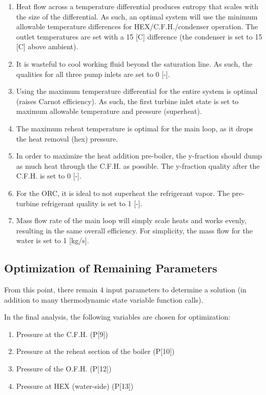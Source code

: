 \documentclass[10pt,cleanfoot]{asme2ej}
\begin{document}
\begin{enumerate}
\item
Heat flow across a temperature differential produces entropy that scales with the size of the differential. As such, an optimal system will use the minimum allowable temperature differences for HEX/C.F.H./condenser operation. The outlet temperatures are set with a 15 [C] difference (the condenser is set to 15 [C] above ambient).
\item
It is wasteful to cool working fluid beyond the saturation line. As such, the qualities for all three pump inlets are set to 0 [-].
\item
Using the maximum temperature differential for the entire system is optimal (raises Carnot efficiency). As such, the first turbine inlet state is set to maximum allowable temperature and pressure (superheat).
\item
The maximum reheat temperature is optimal for the main loop, as it drops the heat removal (hex) pressure.
\item
In order to maximize the heat addition pre-boiler, the y-fraction should dump as much heat through the C.F.H. as possible. The y-fraction quality after the C.F.H. is set to 0 [-].
\item
For the ORC, it is ideal to not superheat the refrigerant vapor. The pre-turbine refrigerant quality is set to 1 [-].
\item
Mass flow rate of the main loop will simply scale heats and works evenly, resulting in the same overall efficiency. For simplicity, the mass flow for the water is set to 1 [kg/s].
\end{enumerate}

\subsection{Optimization of Remaining Parameters}

From this point, there remain 4 input parameters to determine a solution (in addition to many thermodynamic state variable function calls).

In the final analysis, the following variables are chosen for optimization:

\begin{enumerate}
\item
Pressure at the C.F.H. (P[9])
\item
Pressure at the reheat section of the boiler (P[10])
\item
Pressure of the O.F.H. (P[12])
\item
Pressure at HEX (water-side) (P[13])
\end{enumerate}
\end{document}
